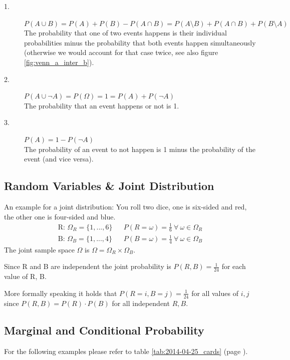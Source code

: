 \documentclass[../main/Notes.tex]{subfiles}
\begin{document}
\begin{description}
  \item[1.] $P(A \cup B) = P(A) + P(B) - P(A \cap B) = P(A \setminus B) + P(A \cap B) + P(B \setminus A)$
            \\ The probability that one of two events happens is their individual probabilities minus the probability that both events happen simultaneously (otherwise we would account for that case twice, see also figure \nolinebreak\ref{fig:venn_a_inter_b}).
  \item[2.] $P(A \cup \neg A) = P(\Omega) = 1 = P(A) + P(\neg A)$
            \\ The probability that an event happens or not is 1.
  \item[3.] $P(A) = 1 - P(\neg A)$
            \\ The probability of an event to not happen is 1 minus the probability of the event (and vice versa).
\end{description}

\subsection{Random Variables \& Joint Distribution}
An example for a joint distribution: You roll two dice, one is six-sided and red, the other one is four-sided and blue.
\begin{align*}
\mbox{R: }\Omega_R = \{1, ..., 6\} & & P(R=\omega) = \frac{1}{6}\ \forall\ \omega \in \Omega_R\\
\mbox{B: }\Omega_B = \{1, ..., 4\} & & P(B=\omega) = \frac{1}{4}\ \forall\ \omega \in \Omega_B
\end{align*}
The joint sample space $\Omega$ is $\Omega = \Omega_R \times \Omega_B$.

Since R and B are independent the joint probability is $ P(R, B) = \frac{1}{24}$ for each value of R, B.

More formally speaking it holds that $P(R=i, B=j) = \frac{1}{24}$ for all values of $i, j$ since $P(R, B) = P(R) \cdot P(B)$ for all independent $R, B$.



\subsection{Marginal and Conditional Probability}
For the following examples please refer to table \ref{tab:2014-04-25_cards} (page \pageref{tab:2014-04-25_cards}).
\end{document}
